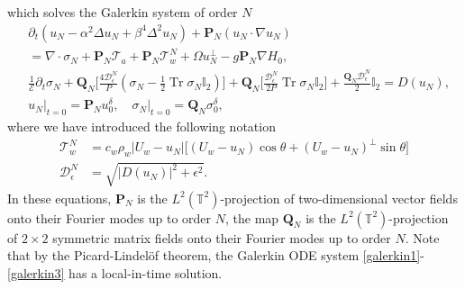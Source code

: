 \documentclass[12pt,a4paper]{article}
\theoremstyle{definition}
\theoremstyle{remark}
\numberwithin{equation}{section}
\DeclareMathOperator{\Tr}{Tr}
\begin{document}
which solves the Galerkin system of order $N$
\begin{align} 
	&\partial_t (u_N - \alpha^2 \Delta u_N + \beta^4 \Delta^2 u_N) + \mathbf{P}_N (u_N \cdot \nabla u_N)  \nonumber \\
    &= \nabla \cdot \sigma_N + \mathbf{P}_N \mathcal{T}_a + \mathbf{P}_N \mathcal{T}_w^N + \Omega u^\perp_N - g \mathbf{P}_N \nabla H_0, \label{galerkin1} \\ 
	&\frac{1}{\mathcal{E}} \partial_t \sigma_N + \mathbf{Q}_N \bigg[\frac{4 \mathcal{D}_\epsilon^N}{P} (\sigma_N - \frac{1}{2} \Tr \sigma_N \mathbb I_2) \bigg] + \mathbf{Q}_N \bigg[ \frac{\mathcal{D}_\epsilon^N}{2 P} \Tr \sigma_N \mathbb I_2 \bigg] + \frac{\mathbf{Q}_N \mathcal{D}_\epsilon^N}{2} \mathbb I_2 = D(u_N), 
	\label{galerkin2} \\
	&u_N \lvert_{t = 0} = \mathbf{P}_N u_0^\delta, \quad \sigma_N \lvert_{t = 0} = \mathbf{Q}_N \sigma_0^\delta, \label{galerkin3}
\end{align}
where we have introduced the following notation
\begin{align}
	\mathcal{T}_{w}^N &= c_w \rho_w \big\lvert U_w - u_N \big\rvert \bigg[ (U_w - u_N) \cos \theta + (U_w - u_N)^\perp \sin \theta \bigg] \label{galerkindrag} \\
	\mathcal{D}_\epsilon^N &= \sqrt{\lvert D(u_N) \rvert^2 + \epsilon^2 }.
\end{align}
In these equations, $\mathbf{P}_N$ is the $L^2 (\mathbb{T}^2)$-projection of two-dimensional vector fields onto their Fourier modes up to order $N$, the map $\mathbf{Q}_N$ is the $L^2 (\mathbb{T}^2)$-projection of $2 \times 2$ symmetric matrix fields onto their Fourier modes up to order $N$. Note that by the Picard-Lindelöf theorem, the Galerkin ODE system \eqref{galerkin1}-\eqref{galerkin3} has a local-in-time solution. 
\end{document}
